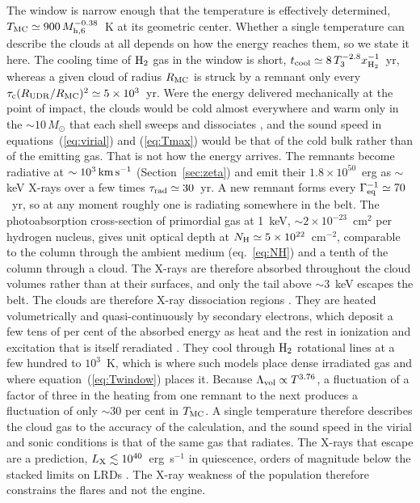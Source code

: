 \documentclass[twocolumn,pdftex]{aastex701}
\newcommand{\msun}{M_{\odot}}
\newcommand{\mhsix}{M_{\rm h,6}}
\newcommand{\Tthree}{T_{3}}
\newcommand{\xhh}{x_{\rm H_2}}
\newcommand{\Geq}{\Gamma_{\rm eq}}
\newcommand{\kms}{\,{\rm km\,s^{-1}}}
\newcommand{\Htwo}{{\rm H_2}}
\begin{document}
The window is narrow enough that the temperature is effectively determined, $T_{\rm MC}\simeq900\,\mhsix^{-0.38}$~K at its geometric center. Whether a single temperature can describe the clouds at all depends on how the energy reaches them, so we state it here. The cooling time of $\Htwo$ gas in the window is short, $t_{\rm cool}\simeq 8\,\Tthree^{-2.8}\xhh^{-1}$~yr, whereas a given cloud of radius $R_{\rm MC}$ is struck by a remnant only every $\tau_{\rm c}(R_{\rm UDR}/R_{\rm MC})^{2}\simeq5\times10^{3}$~yr. Were the energy delivered mechanically at the point of impact, the clouds would be cold almost everywhere and warm only in the $\sim10\,\msun$ that each shell sweeps and dissociates \citep{Hollenbach:1980a}, and the sound speed in equations~(\ref{eq:virial}) and (\ref{eq:Tmax}) would be that of the cold bulk rather than of the emitting gas. That is not how the energy arrives. The remnants become radiative at $\sim10^{3}\kms$ (Section~\ref{sec:zeta}) and emit their $1.8\times10^{50}$~erg as $\sim$keV X-rays over a few times $\tau_{\rm rad}\simeq30$~yr. A new remnant forms every $\Geq^{-1}\simeq70$~yr, so at any moment roughly one is radiating somewhere in the belt. The photoabsorption cross-section of primordial gas at 1~keV, $\sim2\times10^{-23}$~cm$^{2}$ per hydrogen nucleus, gives unit optical depth at $N_{\rm H}\simeq5\times10^{22}$~cm$^{-2}$, comparable to the column through the ambient medium (eq.~\ref{eq:NH}) and a tenth of the column through a cloud. The X-rays are therefore absorbed throughout the cloud volumes rather than at their surfaces, and only the tail above $\sim3$~keV escapes the belt. The clouds are therefore X-ray dissociation regions \citep{Maloney:1996a,Meijerink:2005a,Wolfire:2022a}. They are heated volumetrically and quasi-continuously by secondary electrons, which deposit a few tens of per cent of the absorbed energy as heat and the rest in ionization and excitation that is itself reradiated \citep{Dalgarno:1999a}. They cool through $\Htwo$ rotational lines at a few hundred to $10^{3}$~K, which is where such models place dense irradiated gas and where equation~(\ref{eq:Twindow}) places it. Because $\Lambda_{\rm vol}\propto T^{3.76}$, a fluctuation of a factor of three in the heating from one remnant to the next produces a fluctuation of only $\sim30$ per cent in $T_{\rm MC}$. A single temperature therefore describes the cloud gas to the accuracy of the calculation, and the sound speed in the virial and sonic conditions is that of the same gas that radiates. The X-rays that escape are a prediction, $L_{\rm X}\lesssim10^{40}$~erg~s$^{-1}$ in quiescence, orders of magnitude below the stacked limits on LRDs \citep{Yue:2024a,Ananna:2024a,Maiolino:2025a,Kokubo:2025a}. The X-ray weakness of the population therefore constrains the flares and not the engine.
\end{document}
